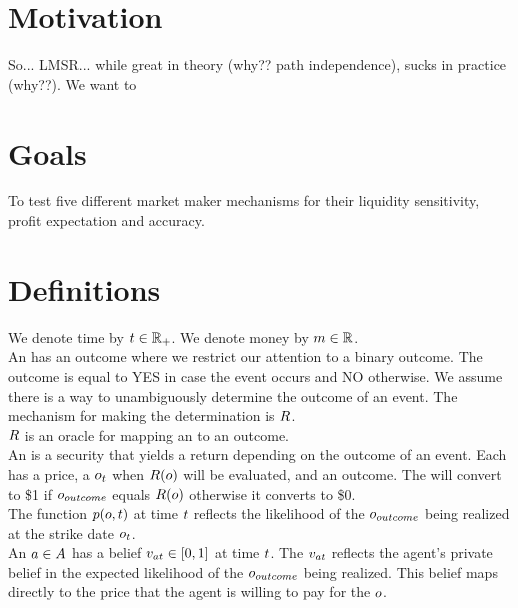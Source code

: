 \section{Motivation}

So... LMSR... while great in theory (why?? path independence), sucks in practice (why??).
We want to 

\section{Goals}
To test five different market maker mechanisms for their liquidity sensitivity,
profit expectation and accuracy.  


\section{Definitions}

We denote time by $t\in\mathbb{R}_+$. We denote money by $m\in\mathbb{R}$.\\

An  has an outcome where we restrict our attention to a binary outcome. 
The outcome is equal to YES in case the event occurs and NO otherwise. We assume there 
is a way to unambiguously determine the outcome of an event. The mechanism for making
the determination is $R$.\\

$R$ is an oracle for mapping an  to an outcome.\\

An  is a security that yields a return depending on the outcome of an 
event. Each  has a price, a $o_{t}$ when $R(o)$ will be
evaluated, and an outcome. The  will convert to \$1 if $o_{outcome}$
equals $R(o)$ otherwise it converts to \$0.\\

The function $p(o,t)$ at time $t$ reflects the likelihood 
of the $o_{outcome}$ being realized at the strike date $o_{t}$.\\

An  $a\in A$ has a belief $v_{at} \in [0,1]$ 
at time $t$. The $v_{at}$ reflects the agent's private belief
in the expected likelihood of the $o_{outcome}$ being realized. This belief maps
directly to the price that the agent is willing to pay for the $o$.\\

